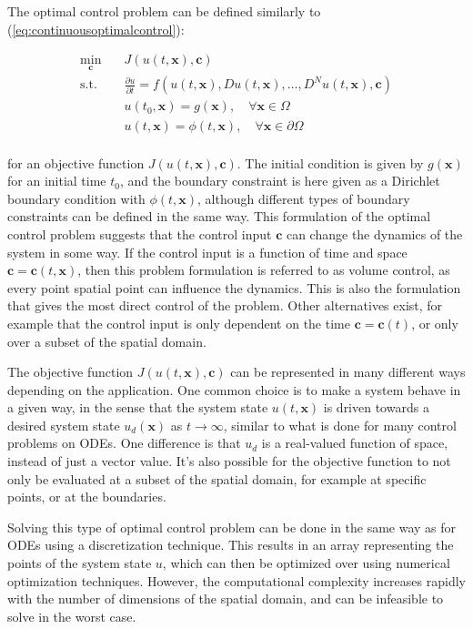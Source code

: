 The optimal control problem can be defined similarly to (\ref{eq:continuousoptimalcontrol}):

\begin{equation}
    \begin{aligned}
        \min_{\bm{c}} \quad & J(u(t, \bm{x}), \bm{c}) \\
        \textrm{s.t.} \quad & \frac{\partial u}{\partial t} = f(u(t, \bm{x}), D u(t, \bm{x}), \dots, D^N u(t, \bm{x}), \bm{c}) \\
        & u(t_0, \bm{x}) = g(\bm{x}), \quad \forall \bm{x} \in \Omega \\
        & u(t, \bm{x}) = \phi(t, \bm{x}), \quad \forall \bm{x} \in \partial \Omega \\
    \end{aligned}
    \label{eq:continuousoptimalcontrolpde}
\end{equation}

\noindent for an objective function $J(u(t, \bm{x}), \bm{c})$. The initial condition is given by $g(\bm{x})$ for an initial time $t_0$, and the boundary constraint is here given as a Dirichlet boundary condition with $\phi(t, \bm{x})$, although different types of boundary constraints can be defined in the same way. This formulation of the optimal control problem suggests that the control input $\bm{c}$ can change the dynamics of the system in some way. If the control input is a function of time and space $\bm{c} = \bm{c}(t, \bm{x})$, then this problem formulation is referred to as volume control, as every point spatial point can influence the dynamics. This is also the formulation that gives the most direct control of the problem. Other alternatives exist, for example that the control input is only dependent on the time $\bm{c} = \bm{c}(t)$, or only over a subset of the spatial domain.

The objective function $J(u(t, \bm{x}), \bm{c})$ can be represented in many different ways depending on the application. One common choice is to make a system behave in a given way, in the sense that the system state $u(t, \bm{x})$ is driven towards a desired system state $u_d(\bm{x})$ as $t \rightarrow \infty$, similar to what is done for many control problems on ODEs. One difference is that $u_d$ is a real-valued function of space, instead of just a vector value. It's also possible for the objective function to not only be evaluated at a subset of the spatial domain, for example at specific points, or at the boundaries.

Solving this type of optimal control problem can be done in the same way as for ODEs using a discretization technique. This results in an array representing the points of the system state $u$, which can then be optimized over using numerical optimization techniques. However, the computational complexity increases rapidly with the number of dimensions of the spatial domain, and can be infeasible to solve in the worst case.

